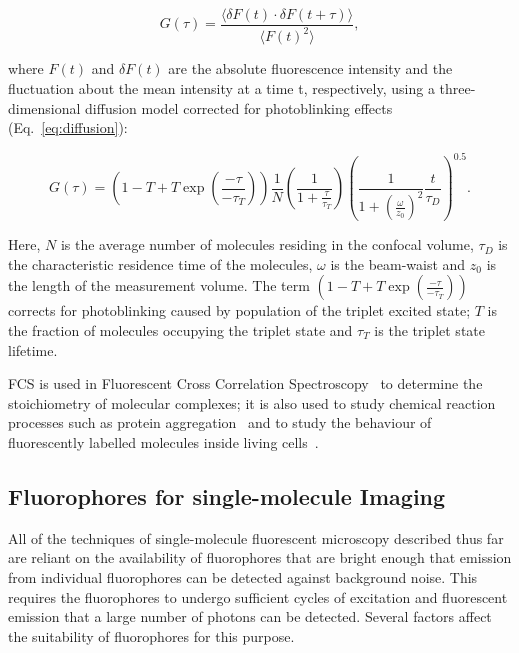\begin{equation}
G(\tau) = \frac{\langle \delta F(t) \cdot \delta F(t + \tau)\rangle}{\langle F(t)^2 \rangle},
\label{eq:fcs}
\end{equation}   

where  $F(t)$ and $\delta F(t)$ are the absolute fluorescence intensity and the fluctuation about the mean intensity at a time t, respectively, using a three-dimensional diffusion model corrected for photoblinking effects (Eq.~\ref{eq:diffusion}): 

\begin{equation}
G(\tau) = \left( 1 - T + T\exp(\frac{-\tau}{-\tau_T}) \right)\frac{1}{N}\left( \frac{1}{1 + \frac{\tau}{\tau_T}} \right)\left( \frac{1}{1 + (\frac{\omega}{z_0})^2}\frac{t}{\tau_D}\right)^{0.5}.
\label{eq:diffusion}
\end{equation}   

Here, $N$ is the average number of molecules residing in the confocal volume, $\tau_D$ is the characteristic residence time of the molecules, $\omega$ is the beam-waist and $z_0$ is the length of the measurement volume. The term $\left( 1 - T + T\exp(\frac{-\tau}{-\tau_T}) \right)$ corrects for photoblinking caused by population of the triplet excited state; $T$ is the fraction of molecules occupying the triplet state and $\tau_T$ is the triplet state lifetime.

FCS is used in Fluorescent Cross Correlation Spectroscopy~\cite{Bacia2007} to determine the stoichiometry of molecular complexes; it is also used to study chemical reaction processes such as protein aggregation~\cite{Berland1996, Tjernberg1999} and to study the behaviour of fluorescently labelled molecules inside living cells~\cite{Bacia2006}. 

\subsection{Fluorophores for single-molecule Imaging}
\label{sect:fluorophores}
All of the techniques of single-molecule fluorescent microscopy described thus far are reliant on the availability of fluorophores that are bright enough that emission from individual fluorophores can be detected against background noise.  This requires the fluorophores to undergo sufficient cycles of excitation and fluorescent emission that a large number of photons can be detected. Several factors affect the suitability of fluorophores for this purpose.

